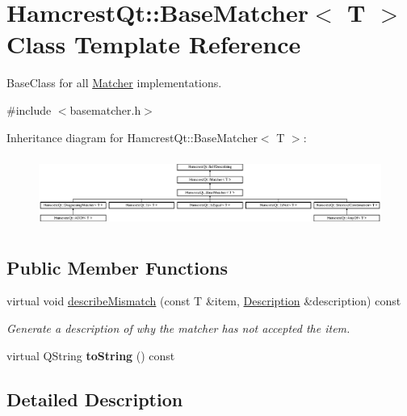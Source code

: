 \hypertarget{class_hamcrest_qt_1_1_base_matcher}{\section{Hamcrest\-Qt\-:\-:Base\-Matcher$<$ T $>$ Class Template Reference}
\label{class_hamcrest_qt_1_1_base_matcher}
}


Base\-Class for all \hyperlink{class_hamcrest_qt_1_1_matcher}{Matcher} implementations.  




{\ttfamily \#include $<$basematcher.\-h$>$}

Inheritance diagram for Hamcrest\-Qt\-:\-:Base\-Matcher$<$ T $>$\-:\begin{figure}[H]
\begin{center}
\leavevmode
\includegraphics[height=2.343096cm]{class_hamcrest_qt_1_1_base_matcher}
\end{center}
\end{figure}
\subsection*{Public Member Functions}
\begin{DoxyCompactItemize}
\item 
virtual void \hyperlink{class_hamcrest_qt_1_1_base_matcher_a4299e8a4358ff624fb857a3301dd1b73}{describe\-Mismatch} (const T \&item, \hyperlink{class_hamcrest_qt_1_1_description}{Description} \&description) const 
\begin{DoxyCompactList}\small\item\em Generate a description of why the matcher has not accepted the item. \end{DoxyCompactList}\item 
\hypertarget{class_hamcrest_qt_1_1_base_matcher_a8d28bd3b881fa3ebb2177771360328ed}{virtual Q\-String {\bfseries to\-String} () const }\label{class_hamcrest_qt_1_1_base_matcher_a8d28bd3b881fa3ebb2177771360328ed}

\end{DoxyCompactItemize}


\subsection{Detailed Description}
